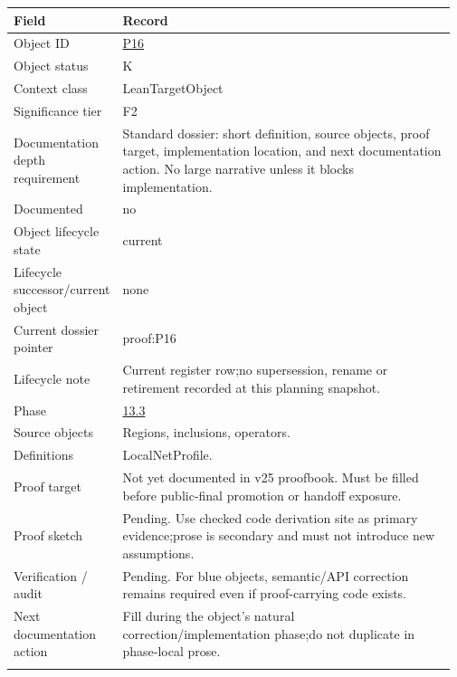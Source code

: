 \begin{longtable}{L{0.16\linewidth} L{0.81\linewidth}}
\hline
\textbf{Field} & \textbf{Record}\\
\hline
Object ID & \hyperlink{object-row-P16}{P16}\\
\hline\addlinespace[0.20em]
Object status & K\\
\hline\addlinespace[0.20em]
Context class & LeanTargetObject\\
\hline\addlinespace[0.20em]
Significance tier & F2\\
\hline\addlinespace[0.20em]
Documentation depth requirement & Standard dossier: short definition, source objects, proof target, implementation location, and next documentation action. No large narrative unless it blocks implementation.\\
\hline\addlinespace[0.20em]
Documented & no\\
\hline\addlinespace[0.20em]
Object lifecycle state & current\\
\hline\addlinespace[0.20em]
Lifecycle successor/\allowbreak{}current object & none\\
\hline\addlinespace[0.20em]
Current dossier pointer & proof:P16\\
\hline\addlinespace[0.20em]
Lifecycle note & Current register row;\newline no supersession, rename or retirement recorded at this planning snapshot.\\
\hline\addlinespace[0.20em]
Phase & \hyperlink{phase-row-13-3}{13.3}\\
\hline\addlinespace[0.20em]
Source objects & Regions, inclusions, operators.\\
\hline\addlinespace[0.20em]
Definitions & LocalNetProfile.\\
\hline\addlinespace[0.20em]
Proof target & Not yet documented in v25 proofbook. Must be filled before public-final promotion or handoff exposure.\\
\hline\addlinespace[0.20em]
Proof sketch & Pending. Use checked code derivation site as primary evidence;\newline prose is secondary and must not introduce new assumptions.\\
\hline\addlinespace[0.20em]
Verification /\allowbreak{} audit & Pending. For blue objects, semantic/\allowbreak{}API correction remains required even if proof-carrying code exists.\\
\hline\addlinespace[0.20em]
Next documentation action & Fill during the object's natural correction/\allowbreak{}implementation phase;\newline do not duplicate in phase-local prose.\\
\hline\addlinespace[0.20em]
\end{longtable}
